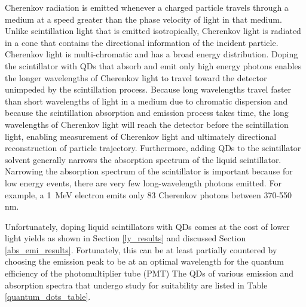\documentclass{JINST}
\begin{document}
Cherenkov radiation is emitted whenever a charged particle travels through a medium at a speed greater than the phase velocity of light in that medium. Unlike scintillation light that is emitted isotropically, Cherenkov light is radiated in a cone that contains the directional information of the incident particle. Cherenkov light is multi-chromatic and has a broad energy distribution. Doping the scintillator with QDs that absorb and emit only high energy photons enables the longer wavelengths of Cherenkov light to travel toward the detector unimpeded by the scintillation process. Because long wavelengths travel faster than short wavelengths of light in a medium due to chromatic dispersion and because the scintillation absorption and emission process takes time, the long wavelengths of Cherenkov light will reach the detector before the scintillation light, enabling measurement of Cherenkov light and ultimately directional reconstruction of particle trajectory.  Furthermore, adding QDs to the scintillator solvent generally narrows the absorption spectrum of the liquid scintillator. Narrowing the absorption spectrum of the scintillator is important because for low energy events, there are very few long-wavelength photons emitted. For example, a 1~MeV electron emits only 83 Cherenkov photons between 370-550 nm\cite{lindley14}. 

Unfortunately, doping liquid scintillators with QDs comes at the cost of lower light yields as shown in Section \ref{ly_results} and discussed Section \ref{abs_emi_results}. Fortunately, this can be at least partially countered by choosing the emission peak to be at an optimal wavelength for the quantum efficiency of the photomultiplier tube (PMT)\cite{hamamatsupmt} The QDs of various emission and absorption spectra that undergo study for suitability are listed in Table \ref{quantum_dots_table}.
 
\end{document}
